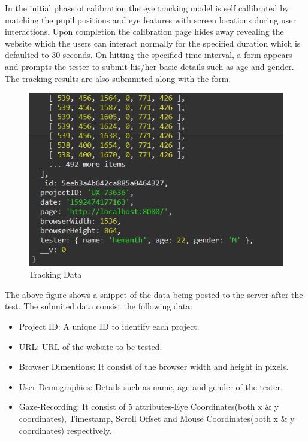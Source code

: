 \documentclass[12pt,a4paper,final]{extreport}
\begin{document}
In the initial phase of calibration the eye tracking model is self callibrated by matching the pupil positions and eye features with screen locations during user interactions.
Upon completion the calibration page hides away revealing the website which the users can interact normally for the specified duration which is defaulted to 30 seconds. On hitting the specified time interval, a form appears and prompts the tester to submit his/her basic details such as age and gender. The tracking results are also submmited along with the form.
\begin{figure}[H]
    \centering
    \includegraphics[width=\linewidth]{tracking-data.png}
    \caption{Tracking Data}
\end{figure}

The above figure shows a snippet of the data being posted to the server after the test.
The submited data consist the following data:
\begin{itemize}
	\item Project ID: A unique ID to identify each project.
	\item URL: URL of the website to be tested.
	\item Browser Dimentions: It consist of the browser width and height in pixels.
	\item User Demographics: Details such as name, age and gender of the tester.
	\item Gaze-Recording: It consist of 5 attributes-Eye Coordinates(both x \& y coordinates), Timestamp, Scroll Offset and Mouse Coordinates(both x \& y coordinates) respectively.
\end{itemize}
\end{document}
